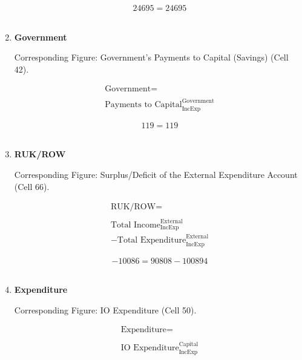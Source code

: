 \begin{enumerate}
\begin{equation} \nonumber
24695 = 24695
\end{equation}\\


\item \textbf {Government}

Corresponding Figure: Government's Payments to Capital (Savings) (Cell 42).

\begin{equation}
\begin{split}
\text{Government} =  \\ \\
\text{Payments to Capital}^\text{Government}_\text{IncExp}
\end{split} \label{eq:2.5.51}
\end{equation}

\begin{equation} \nonumber
119 = 119
\end{equation}\\


\item \textbf {RUK/ROW}

Corresponding Figure: Surplus/Deficit of the External Expenditure Account (Cell 66).

\begin{equation}
\begin{split}
\text{RUK/ROW} =  \\ \\
\text{Total Income}^\text{External}_\text{IncExp}\\
-\text{Total Expenditure}^\text{External}_\text{IncExp}
\end{split} \label{eq:2.5.52}
\end{equation}

\begin{equation} \nonumber
-10086 = 90808-100894
\end{equation}\\


\pagebreak

\item \textbf {Expenditure}

Corresponding Figure: IO Expenditure (Cell 50).
    
\begin{equation}
\begin{split}
\text{Expenditure} =  \\ \\
\text{IO Expenditure}^\text{Capital}_\text{IncExp}
\end{split} \label{eq:2.5.53}
\end{equation}


\end{enumerate}
